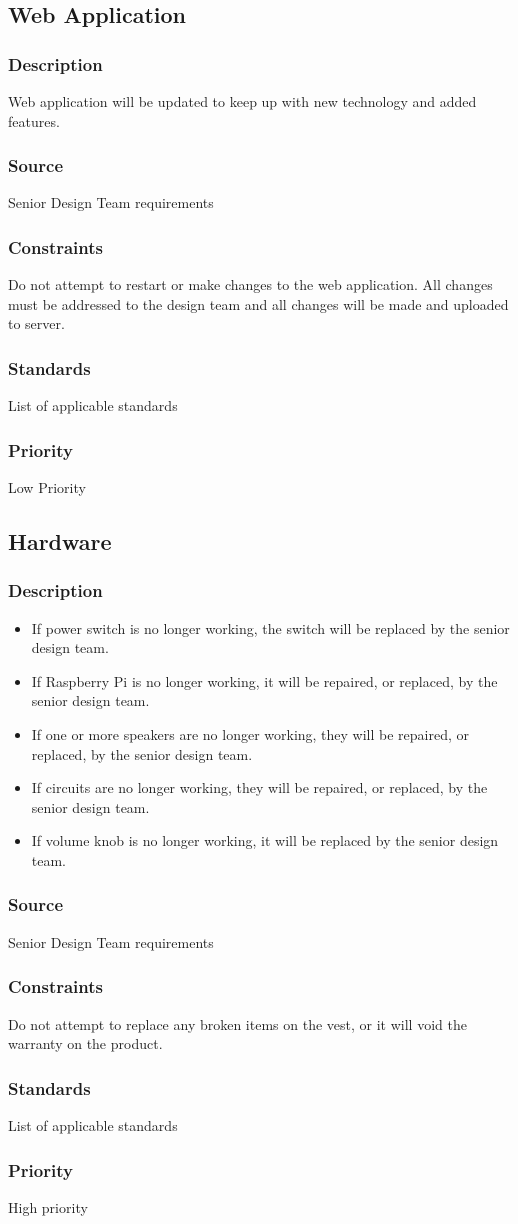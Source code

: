 \subsection{Web Application}
\subsubsection{Description}
Web application will be updated to keep up with new technology and added features.
\subsubsection{Source}
Senior Design Team requirements
\subsubsection{Constraints}
Do not attempt to restart or make changes to the web application. All changes must be addressed to the design team and all changes will be made and uploaded to server.
\subsubsection{Standards}
List of applicable standards
\subsubsection{Priority}
Low Priority

\subsection{Hardware}
\subsubsection{Description}
\begin{itemize}
\item If power switch is no longer working, the switch will be replaced by the senior design team.
\item If Raspberry Pi is no longer working, it will be repaired, or replaced, by the senior design team.
\item If one or more speakers are no longer working, they will be repaired, or replaced, by the senior design team.
\item If circuits are no longer working, they will be repaired, or replaced, by the senior design team.
\item If volume knob is no longer working, it will be replaced by the senior design team.
\end{itemize}
\subsubsection{Source}
Senior Design Team requirements
\subsubsection{Constraints}
Do not attempt to replace any broken items on the vest, or it will void the warranty on the product.
\subsubsection{Standards}
List of applicable standards
\subsubsection{Priority}
High priority